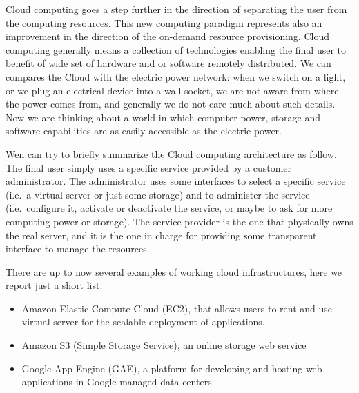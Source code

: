 


Cloud computing goes a step further in the direction of separating the user from the 
computing resources. This new computing paradigm represents also an improvement in the direction 
of the on-demand resource provisioning. Cloud computing generally means a collection of technologies 
enabling the final user to benefit of wide set of hardware and or software remotely distributed.
We can compares the Cloud with the electric power
network: when we switch on a light, or we plug an
electrical device into a wall socket, we are not aware from where the
power comes from, and generally we do not care much about such details.
Now we are thinking about a world in which computer power, storage and software capabilities 
are as easily accessible as the electric power. 

Wen can try to briefly summarize the Cloud computing architecture as follow. 
The final user simply uses a specific service provided by a customer administrator.
The administrator uses some interfaces to select a specific service (i.e.\ a virtual server or 
just some storage) and to administer the service (i.e.\ configure it, activate or deactivate 
the service, or maybe to ask for more computing power or storage). 
The service provider is the one that physically owns the real server, and 
it is the one in charge for providing some transparent interface to manage 
the resources.

There are up to now several examples of working cloud infrastructures, here we report just a 
short list:

\begin{itemize}
\item Amazon Elastic Compute Cloud (EC2), that allows users to rent and use virtual server  
for the scalable deployment of applications.
\item Amazon S3 (Simple Storage Service), an online storage web service
\item Google App Engine (GAE), a platform for developing and hosting web applications 
in Google-managed data centers

\end{itemize}



